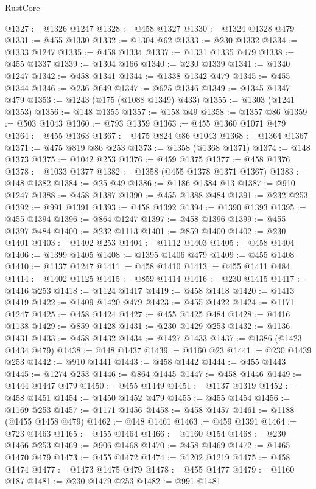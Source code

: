 \begin{lexlean}{RustCore}
\begin{coremodule}
@1327 := @1326 @1247
@1328 := @458 @1327
@1330 := @1324 @1328 @479
@1331 := @455 @1330
@1332 := @1304 @62
@1333 := @230 @1332
@1334 := @1333 @1247
@1335 := @458 @1334
@1337 := @1331 @1335 @479
@1338 := @455 @1337
@1339 := @1304 @166
@1340 := @230 @1339
@1341 := @1340 @1247
@1342 := @458 @1341
@1344 := @1338 @1342 @479
@1345 := @455 @1344
@1346 := @236 @649
@1347 := @625 @1346
@1349 := @1345 @1347 @479
@1353 := @1243 (@175 (@1088 @1349) @433)
@1355 := @1303 (@1241 @1353)
@1356 := @148 @1355
@1357 := @158 @49
@1358 := @1357 @86
@1359 := @503 @1043
@1360 := @793 @1359
@1363 := @455 @1360 @1071 @479
@1364 := @455 @1363
@1367 := @475 @824 @86 @1043
@1368 := @1364 @1367
@1371 := @475 @819 @86 @253
@1373 := @1358 (@1368 @1371)
@1374 := @148 @1373
@1375 := @1042 @253
@1376 := @459 @1375
@1377 := @458 @1376
@1378 := @1033 @1377
@1382 := @1358 (@455 @1378 @1371 @1367)
@1383 := @148 @1382
@1384 := @25 @49
@1386 := @1186 @1384 @13
@1387 := @910 @1247
@1388 := @458 @1387
@1390 := @455 @1388 @484
@1391 := @232 @253
@1392 := @991 @1391
@1393 := @458 @1392
@1394 := @1390 @1393
@1395 := @455 @1394
@1396 := @864 @1247
@1397 := @458 @1396
@1399 := @455 @1397 @484
@1400 := @232 @1113
@1401 := @859 @1400
@1402 := @230 @1401
@1403 := @1402 @253
@1404 := @1112 @1403
@1405 := @458 @1404
@1406 := @1399 @1405
@1408 := @1395 @1406 @479
@1409 := @455 @1408
@1410 := @1137 @1247
@1411 := @458 @1410
@1413 := @455 @1411 @484
@1414 := @1402 @1125
@1415 := @859 @1414
@1416 := @230 @1415
@1417 := @1416 @253
@1418 := @1124 @1417
@1419 := @458 @1418
@1420 := @1413 @1419
@1422 := @1409 @1420 @479
@1423 := @455 @1422
@1424 := @1171 @1247
@1425 := @458 @1424
@1427 := @455 @1425 @484
@1428 := @1416 @1138
@1429 := @859 @1428
@1431 := @230 @1429 @253
@1432 := @1136 @1431
@1433 := @458 @1432
@1434 := @1427 @1433
@1437 := @1386 (@1423 @1434 @479)
@1438 := @148 @1437
@1439 := @1160 @23
@1441 := @230 @1439 @253
@1442 := @910 @1441
@1443 := @458 @1442
@1444 := @455 @1443
@1445 := @1274 @253
@1446 := @864 @1445
@1447 := @458 @1446
@1449 := @1444 @1447 @479
@1450 := @455 @1449
@1451 := @1137 @1319
@1452 := @458 @1451
@1454 := @1450 @1452 @479
@1455 := @455 @1454
@1456 := @1169 @253
@1457 := @1171 @1456
@1458 := @458 @1457
@1461 := @1188 (@1455 @1458 @479)
@1462 := @148 @1461
@1463 := @459 @1391
@1464 := @723 @1463
@1465 := @455 @1464
@1466 := @1160 @154
@1468 := @230 @1466 @253
@1469 := @906 @1468
@1470 := @458 @1469
@1472 := @1465 @1470 @479
@1473 := @455 @1472
@1474 := @1202 @1219
@1475 := @458 @1474
@1477 := @1473 @1475 @479
@1478 := @455 @1477
@1479 := @1160 @187
@1481 := @230 @1479 @253
@1482 := @991 @1481

\end{coremodule}
\end{lexlean}
